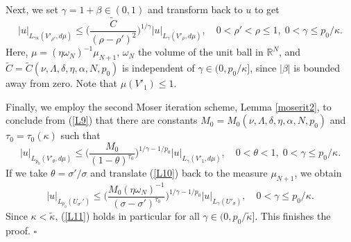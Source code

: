 \documentclass[10pt]{article}
\newcommand{\iR}{\mathbb{R}}
\begin{document}
Next, we set $\gamma=1+\beta\in (0,1)$ and transform back to $u$
to get
\begin{equation} \label{L9}
|u|_{L_{\gamma\kappa}(V'_{\rho'},d\mu)}\le
\Big(\frac{\tilde{C}}{(\rho-\rho')^{2}}\Big)^{1/\gamma}
|u|_{L_{\gamma}(V'_{\rho},d\mu)},\quad 0<\rho'<\rho\le
1,\;0<\gamma\le p_0/\kappa.
\end{equation}
Here, $\mu=(\eta \omega_N)^{-1}\mu_{N+1}$, $\omega_N$ the volume
of the unit ball in $\iR^N$, and
$\tilde{C}=\tilde{C}(\nu,\Lambda,\delta,\eta,\alpha,N,p_0)$ is
independent of $\gamma\in(0,p_0/\kappa]$, since $|\beta|$ is
bounded away from zero. Note that $\mu(V'_1)\le 1$.

Finally, we employ the second Moser iteration scheme, Lemma
\ref{moserit2}, to conclude from (\ref{L9}) that there are
constants $M_0=M_0(\nu,\Lambda,\delta,\eta,\alpha,N,p_0)$ and
$\tau_0=\tau_0(\kappa)$ such that
\begin{equation} \label{L10}
|u|_{L_{p_0}(V'_{\theta},d\mu)}\le
\Big(\frac{M_0}{(1-\theta)^{\tau_0}}\Big)^{1/\gamma-1/p_0}
|u|_{L_{\gamma}(V'_{1},d\mu)},\quad 0<\theta< 1,\;0<\gamma\le
p_0/\kappa.
\end{equation}
If we take $\theta=\sigma'/\sigma$ and translate (\ref{L10}) back
to the measure $\mu_{N+1}$, we obtain
\begin{equation} \label{L11}
|u|_{L_{p_0}(U_{\sigma'}')}\le \Big(\frac{M_0 (\eta\omega_N)^{-1}
}{(\sigma-\sigma')^{\tau_0}}\Big)^{1/\gamma-1/p_0}
|u|_{L_{\gamma}(U'_\sigma)},\quad 0<\gamma\le p_0/\kappa.
\end{equation}
Since $\kappa<\tilde{\kappa}$, (\ref{L11}) holds in particular for
all $\gamma\in (0,p_0/\tilde{\kappa}]$. This finishes the proof.
$\square$
\end{document}
